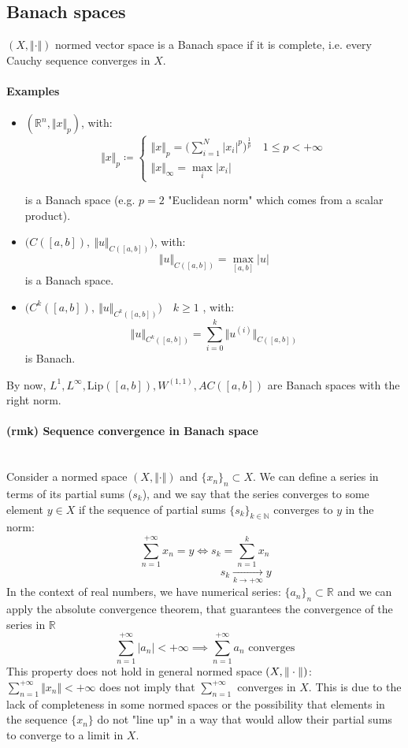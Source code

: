 \subsection{Banach spaces} %
$(X,\Vert\cdot \Vert )$ normed vector space is a Banach space if it is complete, i.e. every Cauchy sequence converges in $X$.
\paragraph{Examples}
\begin{itemize}
    \item $(\mathbb R^n,\Vert x\Vert_p)$, with:
    $$\Vert x\Vert_p\coloneqq\begin{cases}
        \Vert x\Vert_p=\Big (\sum_{i=
    1}^N|x_i|^p\Big )^{\frac 1p}\quad 1\leq p<+\infty\\
    \Vert x\Vert_\infty=\max_i|x_i|
    \end{cases}$$

 is a Banach space (e.g. $p=2$ "Euclidean norm" which comes from a scalar product).
 \item $\Big(C([a,b]),\ \Vert u\Vert _{C([a,b])}\Big)$, with:
 $$\Vert u\Vert _{C([a,b])}=\max _{[a,b]}|u|$$ is a Banach space.
 \item $\Big (C^k([a,b]), \ \Vert u\Vert_{C^k([a,b])} \Big)\quad k\geq 1$
 , with:
 $$\Vert u\Vert_{C^k([a,b])}=\sum_{i=0}^k \Vert u^{(i)}\Vert_{C([a,b])}$$ is Banach.
\end{itemize}
By now, $L^1,L^\infty, \mathrm{Lip}([a,b]), W^{(1,1)}, AC([a,b])$ are Banach spaces with the right norm.
\paragraph{(rmk) Sequence convergence in Banach space}\ \\
Consider a normed space $(X,\Vert\cdot \Vert)$ and $\{x_n\}_n\subset X$.
We can define a series in terms of its partial sums 
 ($s_k$), and we say that the series converges to some element $y\in X$ if the sequence of partial sums $\{s_k\}_{k\in \mathbb N}$ converges to $y$ in the norm:
$$\sum_{n=1}^{+\infty} x_n=y\iff s_k=\sum_{n=1}^kx_n$$
$$\quad \quad \quad \quad \quad \quad \quad\ \  s_k\xrightarrow[k\to +\infty]{} y$$
In the context of real numbers, we have numerical series: $\{a_n\}_n\subset \mathbb R$ and we can apply the absolute convergence theorem, that guarantees the convergence of the series in $\mathbb R$
$$\sum_{n=1}^{+\infty}|a_n|<+\infty\implies \sum_{n=1}^{+\infty} a_n \text{ converges}$$
This property does not hold in general normed space $(X,\Vert \cdot \Vert)$: $\sum_{n=1}^{+\infty}\Vert x_n\Vert <+\infty$ does not imply that $\sum_{n=1}^{+\infty}$ converges in $X$. This is due to the lack of completeness in some normed spaces or the possibility that elements in the sequence $\{x_n\}$ do not "line up" in a way that would allow their partial sums to converge to a limit in $X$.

